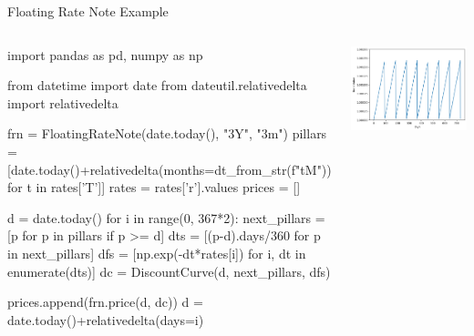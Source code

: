 \documentclass{beamer}
\begin{document}
\begin{frame}[fragile]{Floating Rate Note Example}
\begin{columns}
\begin{ipython}
import pandas as pd, numpy as np

from datetime import date
from dateutil.relativedelta import relativedelta

frn = FloatingRateNote(date.today(), "3Y", "3m")
pillars = [date.today()+relativedelta(months=dt_from_str(f"{t}M")) 
           for t in rates['T']]
rates = rates['r'].values
prices = []

d = date.today()
for i in range(0, 367*2):
  next_pillars = [p for p in pillars if p >= d]
  dts = [(p-d).days/360 for p in next_pillars]
  dfs = [np.exp(-dt*rates[i]) for i, dt in enumerate(dts)]
  dc = DiscountCurve(d, next_pillars, dfs)

  prices.append(frn.price(d, dc))
  d = date.today()+relativedelta(days=i)
\end{ipython}
\begin{center}
    \includegraphics[width=0.9\linewidth]{images/frn_sawtooth}
\end{center}
\end{columns}
\end{frame}
\end{document}
